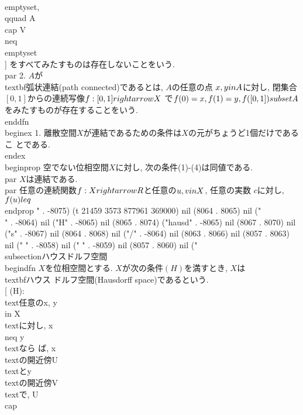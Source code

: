  \\emptyset, \\qquad A\\cap V\\neq\\emptyset
 \\]
 をすべてみたすものは存在しないことをいう.
 \\par 2. $A$が\\textbf{弧状連結}(path connected)であるとは, $A$の任意の点
 $x, y\\in A$に対し, 閉集合$[0, 1]$からの連続写像$f:[0, 1]\\rightarrow X$
 で$f(0)=x, f(1)=y, f([0, 1])\\subset A$をみたすものが存在することをいう.
\\end{dfn}
\\begin{ex}
 1. 離散空間$X$が連結であるための条件は$X$の元がちょうど1個だけであるこ
 とである.
\\end{ex}
\\begin{prop}
 空でない位相空間$X$に対し, 次の条件(1)-(4)は同値である.
 \\par $X$は連結である.
 \\par 任意の連続関数$f:X\\rightarrow \\R$と任意の$u, v\\in X$, 任意の実数
 $c$に対し, $f(u)\\leq $
\\end{prop}
" . -8075) (t 21459 3573 877961 369000) nil (8064 . 8065) nil ("\\" . -8064) nil ("H" . -8065) nil (8065 . 8074) ("hausd" . -8065) nil (8067 . 8070) nil ("s" . -8067) nil (8064 . 8068) nil ("/" . -8064) nil (8063 . 8066) nil (8057 . 8063) nil (" " . -8058) nil (" " . -8059) nil (8057 . 8060) nil ("
\\subsection{ハウスドルフ空間}
\\begin{dfn}
 $X$を位相空間とする. $X$が次の条件$(H)$を満すとき, $X$は\\textbf{ハウス
 ドルフ空間}(Hausdorff space)であるという.
 \\[
  (H):\\text{任意の}x, y\\in X\\text{に対し, }x\\neq y\\text{なら
 ば, }x\\text{の開近傍}U\\text{と}y\\text{の開近傍}V\\text{で, }U\\cap
